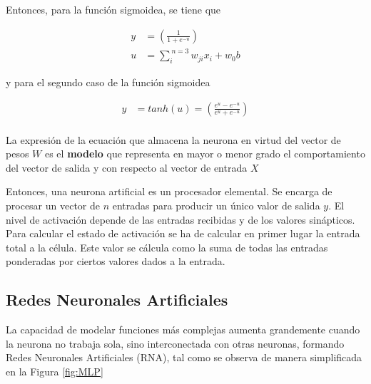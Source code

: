 \documentclass[12pt]{article}
\begin{document}
\begin{enumerate}
Entonces, para la función sigmoidea, se tiene que

\begin{equation} \label{eq3}
\begin{split}
y 	&= ( \frac{1}{1+e^{-u}}) \\
u	&= \sum_{i}^{\ n=3} w_{ji}x_i + w_0b
\end{split}
\end{equation}

y para el segundo caso de la función sigmoidea

\begin{equation} \label{eq3}
\begin{split}
y 	&= tanh(u) = ( \frac{e^u - e^{-u}}{e^u + e^{-u}}) \\
\end{split}
\end{equation}

La expresión de la ecuación que almacena la neurona en virtud del vector de pesos $W$ es el \textbf{modelo} que representa en mayor o menor grado el comportamiento del vector de salida y con respecto al vector de entrada $X$

\end{enumerate}

Entonces, una neurona artificial es un procesador elemental. Se encarga de procesar un vector de $n$ entradas para producir un único valor de salida $y$. El nivel de activación depende de las entradas recibidas y de los valores sinápticos. Para calcular el estado de activación se ha de calcular en primer lugar la entrada total a la célula. Este valor se cálcula como la suma de todas las entradas ponderadas por ciertos valores dados a la entrada.

\clearpage

\subsection{Redes Neuronales Artificiales}
La capacidad de modelar funciones más complejas aumenta grandemente cuando la neurona no trabaja sola, sino interconectada con otras neuronas, formando Redes Neuronales Artificiales (RNA), tal como se observa de manera simplificada en la Figura \ref{fig:MLP}
\end{document}
